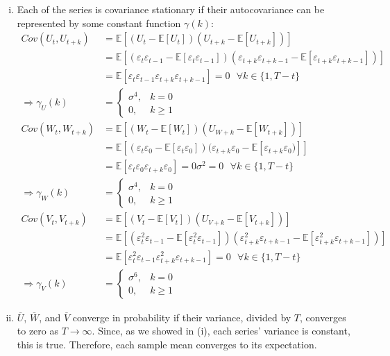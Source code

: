 \documentclass{article}
\newcommand{\eps}{\varepsilon}
\newcommand{\E}[1]{\mathbb{E}\left[#1\right]}%
\begin{document}
\begin{enumerate}[(i)]
	\item Each of the series is covariance stationary if their autocovariance can be represented by some constant function $\gamma(k)$:
		\begin{align*}
			Cov(U_t,U_{t+k}) 	&= \E{(U_t - \E{U_t})(U_{t+k} - \E{U_{t+k}})} 																	\\
								&= \E{(\eps_t\eps_{t-1} - \E{\eps_t\eps_{t-1}})(\eps_{t+k}\eps_{t+k-1} - \E{\eps_{t+k}\eps_{t+k-1}})}			\\
								&= \E{\eps_t\eps_{t-1}\eps_{t+k}\eps_{t+k-1}} = 0 \text{ }\forall k\in\{1,T-t\}									\\
		\Rightarrow\gamma_U(k)	&= \begin{cases} \sigma^4, & k = 0 \\ 0, & k\geq 1 \end{cases}													\\
			Cov(W_t,W_{t+k}) 	&= \E{(W_t - \E{W_t})(U_{W+k} - \E{W_{t+k}})} 																	\\
								&= \E{(\eps_t\eps_0 - \E{\eps_t\eps_0})(\eps_{t+k}\eps_0- \E{\eps_{t+k}\eps_0)}}								\\
								&= \E{\eps_t\eps_0\eps_{t+k}\eps_0} = 0\sigma^2 = 0 \text{ }\forall k\in\{1,T-t\}								\\
		\Rightarrow\gamma_W(k)	&= \begin{cases} \sigma^4, & k = 0 \\ 0, & k\geq 1 \end{cases}													\\
			Cov(V_t,V_{t+k}) 	&= \E{(V_t - \E{V_t})(U_{V+k} - \E{V_{t+k}})} 																	\\
								&= \E{(\eps_t^2\eps_{t-1} - \E{\eps_t^2\eps_{t-1}})(\eps_{t+k}^2\eps_{t+k-1} - \E{\eps_{t+k}^2\eps_{t+k-1}})}	\\
								&= \E{\eps_t^2\eps_{t-1}\eps_{t+k}^2\eps_{t+k-1}} = 0 \text{ }\forall k\in\{1,T-t\}								\\
		\Rightarrow\gamma_V(k)	&= \begin{cases} \sigma^6, & k = 0 \\ 0, & k\geq 1 \end{cases}													
		\end{align*}
	
	\pagebreak
	\item $\overline{U}$, $\overline{W}$, and $\overline{V}$ converge in probability if their variance, divided by $T$, converges to zero as ${T\rightarrow\infty}$. Since, as we showed in (i), each series' variance is constant, this is true. Therefore, each sample mean converges to its expectation.
	

\end{enumerate}
\end{document}
